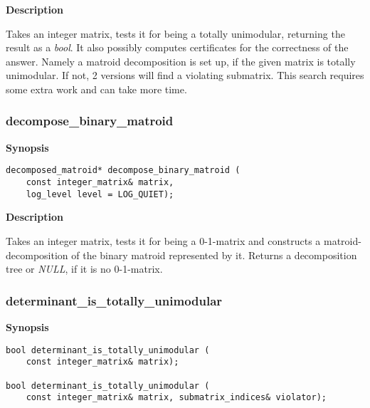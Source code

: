 \documentclass[12pt]{article}
\begin{document}
{\bf Description}

\vspace{2mm}
Takes an integer matrix, tests it for being a totally unimodular, returning the result as a {\em bool}.
It also possibly computes certificates for the correctness of the answer. Namely a matroid decomposition is set up,
if the given matrix is totally unimodular. If not, 2 versions will find a violating submatrix. This search requires
some extra work and can take more time.

\subsubsection{decompose\_binary\_matroid}

{\bf Synopsis} 

{\tiny
{}
\begin{lstlisting}
decomposed_matroid* decompose_binary_matroid (
    const integer_matrix& matrix,
    log_level level = LOG_QUIET);
\end{lstlisting}}

{\bf Description}

\vspace{2mm}
Takes an integer matrix, tests it for being a 0-1-matrix and constructs a matroid-decomposition
of the binary matroid represented by it. Returns a decomposition tree or {\em NULL}, if it is no
0-1-matrix.

\subsubsection{determinant\_is\_totally\_unimodular}

{\bf Synopsis} 

{\tiny
{}
\begin{lstlisting}
bool determinant_is_totally_unimodular (
    const integer_matrix& matrix);

bool determinant_is_totally_unimodular (
    const integer_matrix& matrix, submatrix_indices& violator);
\end{lstlisting}}
\end{document}
